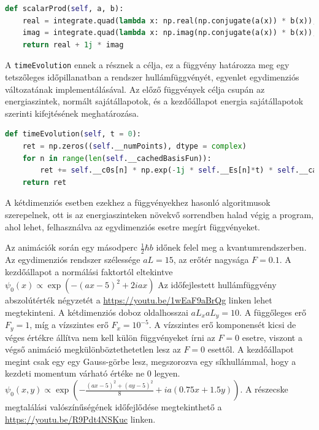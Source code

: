 \begin{lstlisting}[language=Python]
def scalarProd(self, a, b):
    real = integrate.quad(lambda x: np.real(np.conjugate(a(x)) * b(x)), 0, self.__L)[0]
    imag = integrate.quad(lambda x: np.imag(np.conjugate(a(x)) * b(x)), 0, self.__L)[0]
    return real + 1j * imag
\end{lstlisting}
A \texttt{timeEvolution} ennek a résznek a célja, ez a függvény határozza meg egy tetszőleges időpillanatban a rendszer hullámfüggvényét,  egyenlet egydimenziós változatának implementálásával. Az előző függvények célja csupán az energiaszintek, normált sajátállapotok, és a kezdőállapot energia sajátállapotok szerinti kifejtésének meghatározása.
\begin{lstlisting}[language=Python]
def timeEvolution(self, t = 0):
    ret = np.zeros((self.__numPoints), dtype = complex)
    for n in range(len(self.__cachedBasisFun)):
        ret += self.__c0s[n] * np.exp(-1j * self.__Es[n]*t) * self.__cachedBasisFun[n, :]
    return ret
\end{lstlisting}
A kétdimenziós esetben ezekhez a függvényekhez hasonló algoritmusok szerepelnek, ott is az energiaszinteken növekvő sorrendben halad végig a program, ahol lehet, felhasználva az egydimenziós esetre megírt függvényeket.

Az animációk során egy másodperc $\frac{1}{2}\hbar b$ időnek felel meg a kvantumrendszerben. Az egydimenziós rendszer szélessége $aL=15$, az erőtér nagysága $F=0.1$. A kezdőállapot a normálási faktortól eltekintve $\psi_0(x)\propto \exp\left(-(ax-5)^2+2iax\right)$ Az időfejlestett hullámfüggvény abszolútérték négyzetét a \url{https://youtu.be/1wEaF9aBrQg} linken lehet megtekinteni. A kétdimenziós doboz oldalhosszai $aL_xaL_y=10$. A függőleges erő $F_y=1$, míg a vízszintes erő $F_x=10^{-5}$. A vízszintes erő komponensét kicsi de véges értékre állítva nem kell külön függvényeket írni az $F=0$ esetre, viszont a végső animáció megkülönböztethetetlen lesz az $F=0$ esettől. A kezdőállapot megint csak egy egy Gauss-görbe lesz, megszorozva egy síkhullámmal, hogy a kezdeti momentum várható értéke ne $0$ legyen. $\psi_0(x,y)\propto\exp\left(-\frac{(ax-5)^2+(ay-5)^2}{8}+ia(0.75x+1.5y)\right)$. A részecske megtalálási valószínűségének időfejlődése megtekinthető a \url{https://youtu.be/R9Pdt4NSKuc} linken.

